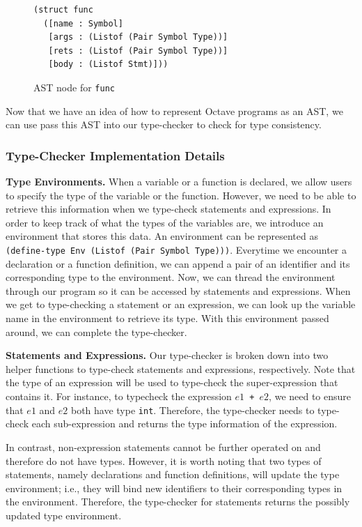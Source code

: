 \begin{figure}[h]
    \begin{lstlisting}[language=racket]
(struct func
  ([name : Symbol]
   [args : (Listof (Pair Symbol Type))]
   [rets : (Listof (Pair Symbol Type))]
   [body : (Listof Stmt)]))
    \end{lstlisting}
    \caption[]{AST node for {\tt func}}
    \label{fig:func}
\end{figure}

Now that we have an idea of how to represent Octave programs as an AST, we can use pass this AST into our type-checker to check for type consistency. 

\subsubsection{Type-Checker Implementation Details}
{\bf Type Environments.} When a variable or a function is declared, we allow users to specify the type of the variable or the function. However, we need to be able to retrieve this information when we type-check statements and expressions. In order to keep track of what the types of the variables are, we introduce an environment that stores this data. An environment can be represented as {\tt (define-type Env (Listof (Pair Symbol Type)))}. Everytime we encounter a declaration or a function definition, we can append a pair of an identifier and its corresponding type to the environment. Now, we can thread the environment through our program so it can be accessed by statements and expressions. When we get to type-checking a statement or an expression, we can look up the variable name in the environment to retrieve its type. With this environment passed around, we can complete the type-checker. 

{\bf Statements and Expressions.} Our type-checker is broken down into two helper functions to type-check statements and expressions, respectively. Note that the type of an expression will be used to type-check the super-expression that contains it. For instance, to typecheck the expression {\tt $e1$ + $e2$}, we need to ensure that $e1$ and $e2$ both have type {\tt int}. Therefore, the type-checker needs to type-check each sub-expression and returns the type information of the expression.

In contrast, non-expression statements cannot be further operated on and therefore do not have types. However, it is worth noting that two types of statements, namely declarations and function definitions, will update the type environment; i.e., they will bind new identifiers to their corresponding types in the environment. Therefore, the type-checker for statements returns the possibly updated type environment.

